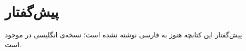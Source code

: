 \chapter*{پیش‌گفتار}

پیش‌گفتار این کتابچه هنوز به فارسی نوشته نشده است؛ نسخه‌ی انگلیسی در  موجود است.
